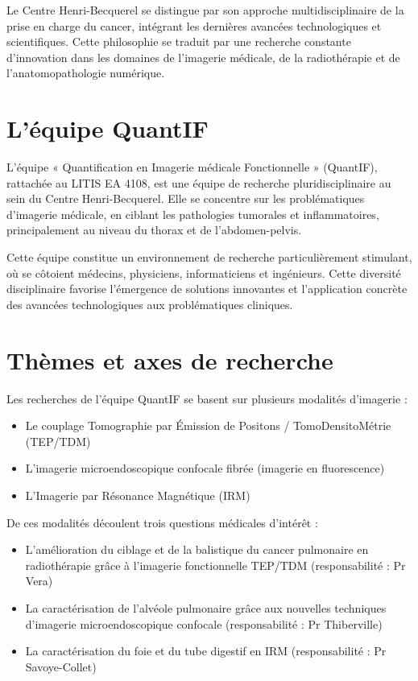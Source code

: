 \documentclass[12pt,a4paper]{report}
\begin{document}
Le Centre Henri-Becquerel se distingue par son approche multidisciplinaire de la prise en charge du cancer, intégrant les dernières avancées technologiques et scientifiques. Cette philosophie se traduit par une recherche constante d'innovation dans les domaines de l'imagerie médicale, de la radiothérapie et de l'anatomopathologie numérique.

\section{L'équipe QuantIF}

L'équipe « Quantification en Imagerie médicale Fonctionnelle » (QuantIF), rattachée au LITIS EA 4108, est une équipe de recherche pluridisciplinaire au sein du Centre Henri-Becquerel. Elle se concentre sur les problématiques d'imagerie médicale, en ciblant les pathologies tumorales et inflammatoires, principalement au niveau du thorax et de l'abdomen-pelvis.

Cette équipe constitue un environnement de recherche particulièrement stimulant, où se côtoient médecins, physiciens, informaticiens et ingénieurs. Cette diversité disciplinaire favorise l'émergence de solutions innovantes et l'application concrète des avancées technologiques aux problématiques cliniques.

\section{Thèmes et axes de recherche}

Les recherches de l'équipe QuantIF se basent sur plusieurs modalités d'imagerie :

\begin{itemize}
\item Le couplage Tomographie par Émission de Positons / TomoDensitoMétrie (TEP/TDM)
\item L'imagerie microendoscopique confocale fibrée (imagerie en fluorescence)
\item L'Imagerie par Résonance Magnétique (IRM)
\end{itemize}

De ces modalités découlent trois questions médicales d'intérêt :

\begin{itemize}
\item L'amélioration du ciblage et de la balistique du cancer pulmonaire en radiothérapie grâce à l'imagerie fonctionnelle TEP/TDM (responsabilité : Pr Vera)
\item La caractérisation de l'alvéole pulmonaire grâce aux nouvelles techniques d'imagerie microendoscopique confocale (responsabilité : Pr Thiberville)
\item La caractérisation du foie et du tube digestif en IRM (responsabilité : Pr Savoye-Collet)
\end{itemize}
\end{document}
